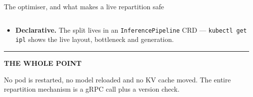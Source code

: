 \documentclass[aspectratio=169,9pt]{beamer}
\newcommand{\hl}[1]{\textbf{\color{keNavy}#1}}
\newenvironment{callout}[2][keBlue]{%
  \begin{beamercolorbox}[wd=\textwidth, sep=6pt, leftskip=4pt]{}%
  \setlength{\fboxrule}{0pt}%
  {\color{#1}\rule{2.5pt}{1.1em}}\hspace{0.5em}%
  {\scriptsize\color{#1}\bfseries\MakeUppercase{#2}}\par\vspace{0.25em}%
  \small
}{\end{beamercolorbox}}
\begin{document}
\begin{frame}[fragile,shrink=20]{The optimiser, and what makes a live repartition safe}
\begin{columns}[T]
\begin{column}{0.48\textwidth}
\begin{itemize}
          so a restarted router is reconciled back in rather than left empty.
        \item \hl{Declarative.} The split lives in an \texttt{InferencePipeline}
          CRD --- \texttt{kubectl get ipl} shows the live layout, bottleneck and
          generation.
      \end{itemize}
      \vspace{0.4em}
      \begin{callout}[keGreen]{the whole point}
        \scriptsize No pod is restarted, no model reloaded and no KV cache moved.
        The entire repartition mechanism is a gRPC call plus a version check.
      \end{callout}
    \end{column}
  \end{columns}
\end{frame}
\end{document}
